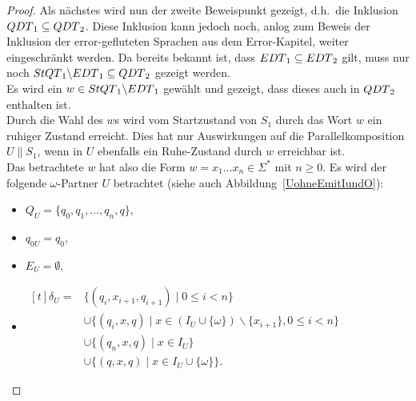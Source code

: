 \begin{proof}
  Als nächstes wird nun der zweite Beweispunkt gezeigt, d.h.\ die Inklusion
  $QDT{}_1\subseteq QDT{}_2$. Diese Inklusion kann jedoch noch, anlog zum
  Beweis der Inklusion der error-gefluteten Sprachen aus dem Error-Kapitel,
  weiter eingeschränkt werden. Da bereits bekannt ist, dass $EDT{}_1\subseteq
  EDT{}_2$ gilt, muss nur noch $StQT{}_1\backslash EDT{}_1\subseteq
  QDT{}_2$ gezeigt werden.\\
  Es wird ein $w\in StQT{}_1\backslash EDT{}_1$ gewählt und gezeigt, dass
  dieses auch in $QDT{}_2$ enthalten ist.\\
  Durch die Wahl des $w$s wird vom Startzustand von $S_1$ durch das Wort $w$
  ein ruhiger Zustand erreicht. Dies hat nur Auswirkungen auf die
  Parallelkomposition $U\|S_1$, wenn in $U$ ebenfalls ein Ruhe-Zustand durch
  $w$ erreichbar ist.\\
  Das betrachtete $w$ hat also die Form $w=x_1\dots x_n\in \Sigma ^*$ mit
  $n\geq 0$. Es wird der folgende $\omega$-Partner $U$ betrachtet (siehe auch
  Abbildung~\ref{UohneEmitIundO}):
  \begin{itemize}
    \item $Q_U=\{q_0,q_1,\dots ,q_n, q\}$,
    \item $q_{0U}=q_0$,
    \item $E_U=\emptyset$,
    \item $\begin{aligned}[t]
        \delta _U=&\{(q_i,x_{i+1},q_{i+1})\mid  0\leq i< n\}\\
                  &\cup\{(q_i,x,q)\mid  x\in (I_U\cup
      \{\omega\})\backslash\{x_{i+1}\}, 0\leq i< n\}\\
                  &\cup\{(q_n,x,q)\mid x\in I_U\}\\
                  &\cup\{(q,x,q)\mid x\in I_U\cup\{\omega\}\}.
    \end{aligned}$
  \end{itemize}
  \begin{figure} [h!tbp]
  \begin{center}
\end{center}
\end{figure}
\end{proof}
